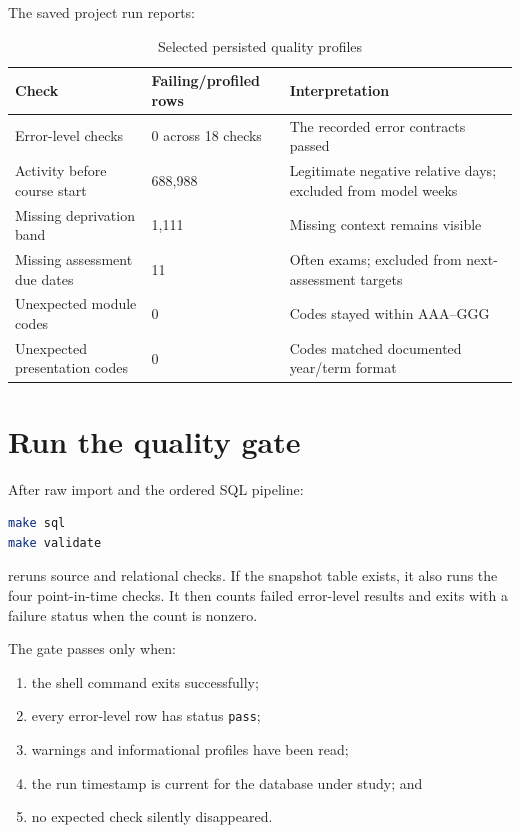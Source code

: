 The saved project run reports:

\begin{table}[htbp]
\centering
\caption{Selected persisted quality profiles}
\label{tab:quality-profiles}
\begin{tabularx}{\textwidth}{L{0.38\textwidth}L{0.18\textwidth}Y}
\toprule
Check & Failing/profiled rows & Interpretation \\
\midrule
Error-level checks & 0 across 18 checks & The recorded error contracts passed \\
Activity before course start & 688,988 & Legitimate negative relative days; excluded from model weeks \\
Missing deprivation band & 1,111 & Missing context remains visible \\
Missing assessment due dates & 11 & Often exams; excluded from next-assessment targets \\
Unexpected module codes & 0 & Codes stayed within AAA--GGG \\
Unexpected presentation codes & 0 & Codes matched documented year/term format \\
\bottomrule
\end{tabularx}
\end{table}


\section{Run the quality gate}

After raw import and the ordered SQL pipeline:

\begin{lstlisting}[language=bash]
make sql
make validate
\end{lstlisting}

 reruns source and relational checks. If the
snapshot table exists, it also runs the four point-in-time checks. It then
counts failed error-level results and exits with a failure status when the count
is nonzero.

\begin{validationbox}
The gate passes only when:
\begin{enumerate}
  \item the shell command exits successfully;
  \item every error-level row has status \texttt{pass};
  \item warnings and informational profiles have been read;
  \item the run timestamp is current for the database under study; and
  \item no expected check silently disappeared.
\end{enumerate}
\end{validationbox}

